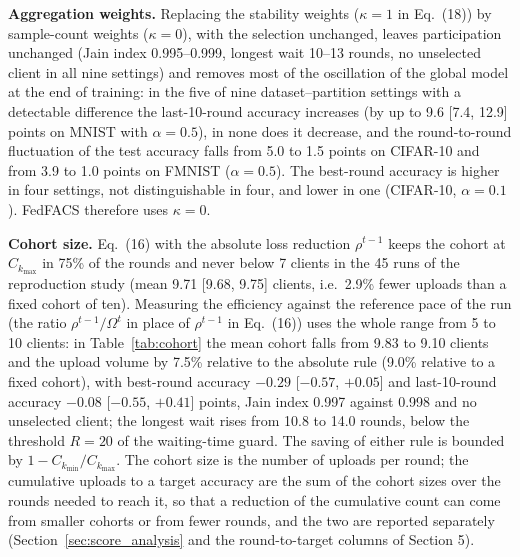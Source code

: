 \textbf{Aggregation weights.} Replacing the stability weights ($\kappa=1$ in Eq.~(18)) by sample-count weights ($\kappa=0$), with the selection unchanged, leaves participation unchanged (Jain index 0.995--0.999, longest wait 10--13 rounds, no unselected client in all nine settings) and removes most of the oscillation of the global model at the end of training: in the five of nine dataset--partition settings with a detectable difference the last-10-round accuracy increases (by up to 9.6 [7.4, 12.9] points on MNIST with $\alpha=0.5$), in none does it decrease, and the round-to-round fluctuation of the test accuracy falls from 5.0 to 1.5 points on CIFAR-10 and from 3.9 to 1.0 points on FMNIST ($\alpha=0.5$). The best-round accuracy is higher in four settings, not distinguishable in four, and lower in one (CIFAR-10, $\alpha=0.1$). FedFACS therefore uses $\kappa=0$.

\textbf{Cohort size.} Eq.~(16) with the absolute loss reduction $\rho^{t-1}$ keeps the cohort at $C_{k_{\max}}$ in 75\% of the rounds and never below 7 clients in the 45 runs of the reproduction study (mean 9.71 [9.68, 9.75] clients, i.e.\ 2.9\% fewer uploads than a fixed cohort of ten). Measuring the efficiency against the reference pace of the run (the ratio $\rho^{t-1}/\Omega^{t}$ in place of $\rho^{t-1}$ in Eq.~(16)) uses the whole range from 5 to 10 clients: in Table~\ref{tab:cohort} the mean cohort falls from 9.83 to 9.10 clients and the upload volume by 7.5\% relative to the absolute rule (9.0\% relative to a fixed cohort), with best-round accuracy $-0.29$ [$-0.57$, $+0.05$] and last-10-round accuracy $-0.08$ [$-0.55$, $+0.41$] points, Jain index 0.997 against 0.998 and no unselected client; the longest wait rises from 10.8 to 14.0 rounds, below the threshold $R=20$ of the waiting-time guard. The saving of either rule is bounded by $1-C_{k_{\min}}/C_{k_{\max}}$. The cohort size is the number of uploads per round; the cumulative uploads to a target accuracy are the sum of the cohort sizes over the rounds needed to reach it, so that a reduction of the cumulative count can come from smaller cohorts or from fewer rounds, and the two are reported separately (Section~\ref{sec:score_analysis} and the round-to-target columns of Section 5).

